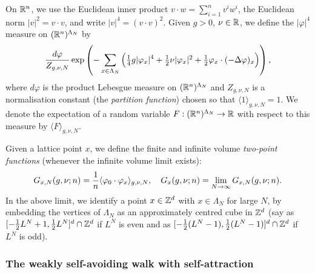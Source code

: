 On ${\mathbb R}^n$, we use the Euclidean inner product $v \cdot w = \sum_{i=1}^n v^i w^i$,
the Euclidean norm $|v|^2 = v\cdot v$,
and write $|v|^4 = (v\cdot v)^2$.
Given $g>0$, $\nu \in {\mathbb R}$, we define
the $|\varphi|^4$ measure on $({\mathbb R}^n)^{\Lambda_N}$ by
\begin{equation}
\frac{d\varphi}{Z_{g,\nu,N}} \exp\left(-\sum_{x\in\Lambda_N}
  \Big(\tfrac{1}{4} g |\varphi_x|^4 + \textstyle{\frac 12} \nu |\varphi_x|^2
    + \textstyle{\frac 12} \varphi_x\cdot (-\Delta \varphi)_x 
  \Big)\right),
\end{equation}
where $d\varphi$ is the product Lebesgue measure on $({\mathbb R}^n)^{\Lambda_N}$
and $Z_{g,\nu,N}$ is a normalisation constant (the \emph{partition function})
chosen so that $\langle 1 \rangle_{g,\nu,N} = 1$. We denote the expectation
of a random variable $F:({\mathbb R}^n)^{\Lambda_N} \rightarrow {\mathbb R}$ with respect to this measure
by $\langle F \rangle_{g,\nu,N}$.

Given a lattice point $x$,
we define the finite and infinite volume \emph{two-point functions}
(whenever the infinite volume limit exists):
\begin{equation}\label{e:two-point-function-phi4}
G_{x, N}(g,\nu; n) =
\frac{1}{n} \langle \varphi_0 \cdot \varphi_x \rangle_{g,\nu, N},
\quad
G_x(g,\nu; n) = \lim_{N \rightarrow \infty} G_{x, N}(g,\nu; n).
\end{equation}
In the above limit, we identify a point $x \in { {{\mathbb Z}}^d }$ with $x \in \Lambda_N$
for large $N$, by embedding the vertices of $\Lambda_N$ as an approximately
centred cube in ${\mathbb Z}^d$ (say as $[-\frac12 L^N+1,\frac12 L^N]^d \cap {\mathbb Z}^d$ if $L^N$ is even
and as $[-\frac12 (L^N-1), \frac12 (L^N-1)]^d \cap {\mathbb Z}^d$ if $L^N$ is odd).


\subsubsection{The weakly self-avoiding walk with self-attraction}

